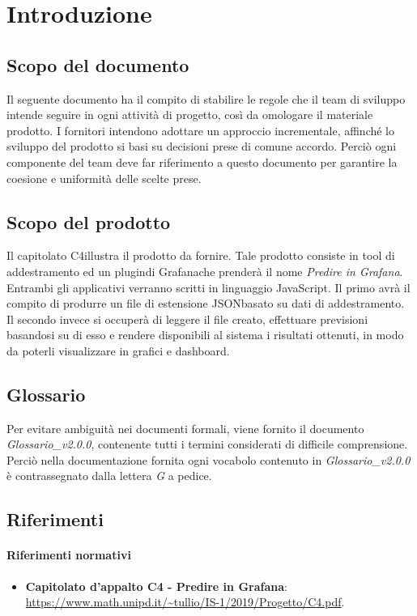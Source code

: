 \section{Introduzione}

\subsection{Scopo del documento}
Il seguente documento ha il compito di stabilire le regole che il team di sviluppo intende seguire in ogni attività di progetto, così da omologare il materiale prodotto.
I fornitori intendono adottare un approccio incrementale\glo, affinché lo sviluppo del prodotto si basi su decisioni prese di comune accordo. Perciò ogni componente del team deve far riferimento a questo documento per garantire la coesione e uniformità delle scelte prese.

\subsection{Scopo del prodotto}
Il capitolato {C4}\glo illustra il prodotto da fornire. Tale prodotto consiste in tool di addestramento ed un plugin\glo di Grafana\glo che prenderà il nome \textit{Predire in Grafana}. Entrambi gli applicativi verranno scritti in linguaggio JavaScript\glo. Il primo avrà il compito di produrre un file di estensione JSON\glo basato su dati di addestramento\glo. Il secondo invece si occuperà di leggere il file creato, effettuare previsioni basandosi su di esso e rendere disponibili al sistema i risultati ottenuti, in modo da poterli visualizzare in grafici e dashboard.
\subsection{Glossario}
Per evitare ambiguità nei documenti formali, viene fornito il documento \textit{Glossario\_v2.0.0}, contenente tutti i termini considerati di difficile comprensione. Perciò nella documentazione fornita ogni vocabolo contenuto in \textit{Glossario\_v2.0.0} è contrassegnato dalla lettera \textit{G} a pedice.
\subsection{Riferimenti}
\paragraph{Riferimenti normativi}
\begin{itemize}
	\item \textbf{Capitolato d'appalto C4 - Predire in Grafana}: \\
	\url{https://www.math.unipd.it/~tullio/IS-1/2019/Progetto/C4.pdf}.	
\end{itemize}
